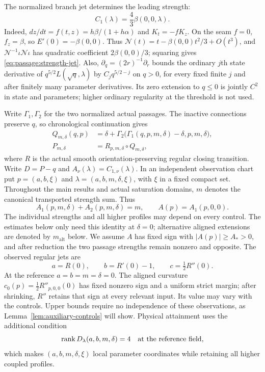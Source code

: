 The normalized branch jet determines the leading strength:
\begin{equation}\label{eq:passage:strength-jet}
 C_1(\lambda)=\frac43\beta(0,0,\lambda).
\end{equation}
Indeed, $dz/dt=f(t,z)=h\beta/(1+h\alpha)$ and $K_t=-fK_z$.
On the seam $f=0$, $f_z=\beta$, so $E'(0)=-\beta(0,0)$.
Thus $\mathcal N(t)=t-\beta(0,0)t^2/3+O(t^3)$, and
$\mathcal N^{-1}\iota\mathcal N\iota$ has quadratic coefficient
$2\beta(0,0)/3$; squaring gives \eqref{eq:passage:strength-jet}.
Also, $\partial_q=(2r)^{-1}\partial_r$ bounds the ordinary $j$th state
derivative of $q^{5/2}L(\sqrt q,\lambda)$ by $C_jq^{5/2-j}$ on
$q>0$, for every fixed finite $j$ and after finitely many parameter
derivatives. Its zero extension to $q\le0$ is jointly $C^2$ in state
and parameters; higher ordinary regularity at the threshold is not used.

Write $\Gamma_1,\Gamma_2$ for the two normalized actual passages.
The inactive connections preserve $q$, so chronological continuation gives
\begin{equation}\label{eq:passage:two-contact-map}
 \begin{aligned}
 Q_{m,\delta}(q,p)&=\delta+
 \Gamma_2\bigl(\Gamma_1(q,p,m,\delta)-\delta,p,m,\delta\bigr),\\
 P_{m,\delta}&=R_{p,m,\delta}\circ Q_{m,\delta},
 \end{aligned}
\end{equation}
where $R$ is the actual smooth orientation-preserving regular closing
transition. Write $D=P-q$ and $A_\nu(\lambda)=C_{1,\nu}(\lambda)$.
In an independent observation chart put $p=(a,b,\xi)$ and
$\lambda=(a,b,m,\delta,\xi)$, with $\xi$ in a fixed compact set.
Throughout the main results and actual saturation domains, $m$ denotes the
canonical transported strength sum. Thus
\begin{equation}\label{eq:net-strength}
 A_1(p,m,\delta)+A_2(p,m,\delta)=m,\qquad A(p)=A_1(p,0,0).
\end{equation}
The individual strengths and all higher profiles may depend on every
control. The estimates below only need this identity at $\delta=0$;
alternative aligned extensions are denoted by $m_{\mathrm{alt}}$ below.
We assume $A$ has fixed sign with
$|A(p)|\ge A_*>0$, and after reduction the two passage strengths
remain nonzero and opposite. The observed regular jets are
\begin{equation}\label{eq:regular-jets}
 a=R(0),\qquad b=R'(0)-1,\qquad c=\tfrac12R''(0).
\end{equation}
At the reference $a=b=m=\delta=0$. The aligned curvature
$c_0(p)=\tfrac12R''_{p,0,0}(0)$ has fixed nonzero sign and a uniform
strict margin; after shrinking, $R''$ retains that sign at every relevant
input. Its value may vary with the controls. Upper bounds require no
independence of these observations, as Lemma~\ref{lem:auxiliary-controls}
will show. Physical attainment uses the additional condition
\begin{equation}\label{eq:rank}
 \operatorname{rank}D_\lambda(a,b,m,\delta)=4
 \quad\hbox{at the reference field},
\end{equation}
which makes $(a,b,m,\delta,\xi)$ local parameter coordinates while
retaining all higher coupled profiles.

